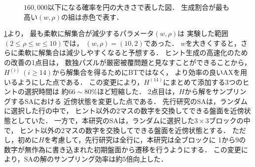 \documentclass[a4paper, 9pt]{jarticle}
\begin{document}
\begin{論文概要}
\begin{figure}[bt]
{  $160,000$以下になる確率を円の大きさで表した図．
  生成割合が最も高い$(w, \rho)$の組は赤色で表す．} 
  \label{fig:best_beam_width_and_rho}
\end{figure}
\figurename{\ref{fig:best_beam_width_and_rho}}より，
最も柔軟に解集合が減少するパラメータ$(w, \rho)$は
実験した範囲$(2 \leq \rho \leq w \leq 10)$では，
$(w, \rho) = (10, 2)$であった．
$w$を大きくすると，さらに柔軟に解集合は減少しやすくなると予想する．
ヒント生成の高速化のための改善の1点目は，
数独パズルが厳密被覆問題と見なすことができることから，
$H^{(i)} ~ (i \geq 14)$から解集合を得るためにBTではなく，
より効率の良いAXを用いるようにした点である．
この変更により，$H^{(14)}$にまとめて添加する3つのヒントの選択時間は
約$66 \sim 80$\%ほど短縮した．
2点目は，$H$から解をサンプリングするSAにおける
近傍状態を変更した点である．
先行研究のSAは，ランダムに選択した行の中で，
ヒント以外の2マスの数字を交換してできる盤面を近傍状態としていた．
一方で，本研究のSAは，ランダムに選択した$3 \times 3$ブロックの中で，
ヒント以外の2マスの数字を交換してできる盤面を近傍状態とする．
ただし，初めに$H$を考慮して，先行研究は全行に，本研究は全ブロックに
1から9の数字が無作為に書き込まれた初期盤面から遷移を行うようにする．
この変更により，SAの解のサンプリング効率は約5倍向上した．


\end{論文概要}
\end{document}
